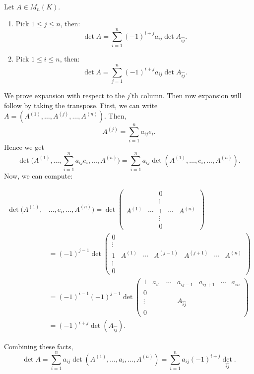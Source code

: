 \documentclass[12pt]{article}
\begin{document}
\begin{lemma}
	Let $A \in M_n(K)$.
	\begin{enumerate}[\normalfont(i)]
		\item Pick $1 \leq j \leq n$, then:
			\[
				\det A = \sum_{i = 1}^{n}(-1)^{i+j} a_{ij} \det A_{\widehat{ij}}
			.\]
		\item Pick $1 \leq i \leq n$, then:
			\[
				\det A = \sum_{j = 1}^{n} (-1)^{i+j} a_{ij} \det A_{\widehat{ij}}
			.\]
	\end{enumerate}
\end{lemma}

\begin{proofbox}
	We prove expansion with respect to the $j$'th column. Then row expansion will follow by taking the transpose. First, we can write $A = (A^{(1)}, \ldots, A^{(j)}, \ldots, A^{(n)})$. Then,
	\[
		A^{(j)} = \sum_{i = 1}^{n} a_{ij}e_i
	.\]
	Hence we get
	\[
		\det \Biggl( A^{(1)}, \ldots, \sum_{i = 1}^{n} a_{ij}e_i, \ldots, A^{(n)} \Biggr) = \sum_{i= 1}^{n} a_{ij} \det (A^{(1)}, \ldots, e_i, \ldots, A^{(n)})
	.\]
	Now, we can compute:

	\begin{align*}
		\det(A^{(1)}, &\ldots, e_i, \ldots, A^{(n)}) = \det
		\begin{pmatrix}
			& & 0 & & \\
			& & \vdots & & \\
			A^{(1)} & \cdots & 1 & \cdots & A^{(n)} \\
			& & \vdots & & \\
			& & 0 & &
		\end{pmatrix}
		\\
							    &= (-1)^{j-1} \det
							    \begin{pmatrix}
								    0 & & & & & & \\
								    \vdots & & & & & & \\
								    1 & A^{(1)} & \cdots & A^{(j-1)} & A^{(j+1)} & \cdots & A^{(n)} \\
								    \vdots & & & & & & \\
								    0 & & & & & &
							    \end{pmatrix} \\
							    &= (-1)^{i-1}(-1)^{j-1} \det
							    \begin{pmatrix}
								    1 & a_{i1} & \cdots & a_{ij-1} & a_{ij+1} & \cdots & a_{in} \\
								    0 && & & & & \\
								    \vdots & & & A_{\widehat{ij}} & & & \\
								    0 & & & & & &
							    \end{pmatrix}
							    \\
							    &= (-1)^{i+j}\det(A_{\widehat{ij}}).
	\end{align*}

	Combining these facts,
	\[
	\det A = \sum_{i = 1}^{n} a_{ij} \det(A^{(1)}, \ldots, a_i, \ldots, A^{(n)}) = \sum_{i = 1}^{n} a_{ij}(-1)^{i+j}\det_{\widehat{ij}}
	.\]
\end{proofbox}
\end{document}
